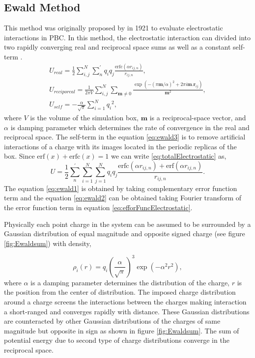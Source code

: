 \subsection{Ewald Method}
This method was originally proposed by  in 1921 to evaluate electrostatic interactions in PBC. In this method, the electrostatic interaction  can divided into two rapidly converging real and reciprocal space sums as well as a constant self-term \cite{Toukmaji96}.  
\begin{subequations}
\begin{gather}
U_{real} = \frac{1}{2} \sum_{i,j}^{N}{\sum_{n}^{'}{{q_i q_j}\frac{\mathrm{erfc}(\alpha r_{ij,n})}{r_{ij,n}}}}, \label{eq:ewald1}\\
U_{reciporcal} = \frac{1}{2\pi V}\sum_{i,j}^{N}{\sum_{\mathbf{m} \neq 0}\frac{\exp(-(\pi \mathbf{m}/\alpha)^2 + 2\pi i \mathbf{m}.\mathbf{r}_{ij})}{\mathbf{m}^2}},\label{eq:ewald2} \\
U_{self} = -\frac{\alpha}{\sqrt{\pi}} \sum_{i =1}^{N} {q_i}^2 ,\label{eq:ewald3}
\end{gather}
\end{subequations}
where $V$ is the volume of the simulation box, $\mathbf{m}$ is a reciprocal-space vector, and $\alpha$ is damping parameter which determines the rate of convergence in the real and reciprocal space. The self-term in the equation \ref{eq:ewald3} is to remove artificial interactions of a charge with its images located in the periodic replicas of the box. Since  $\mathrm{erf}(x) + \mathrm{erfc}(x) = 1$ we can write \ref{eq:totalElectrostatic} as,
\begin{equation}
U = \frac{1}{2}\sum_n^{'}{\sum_{i=1}^N { \sum_{j=1}^N {q_i q_j}}}\frac{\mathrm{erfc}(\alpha r_{ij,n})+\mathrm{erf}(\alpha r_{ij,n})}{r_{ij,n}}.
\label{eq:efforFuncElectrostatic}
\end{equation}
The equation \ref{eq:ewald1} is obtained by taking complementary error function term and the equation \ref{eq:ewald2} can be obtained taking Fourier transform of the error function term in equation \ref{eq:efforFuncElectrostatic}.
 
Physically each point charge in the system can be assumed to be surrounded by a Gaussian distribution of equal magnitude and opposite signed charge (see figure \ref{fig:Ewaldsum}) with density,

\begin{equation}
\rho_i (r) = q_i \left(\frac{\alpha}{\sqrt{\pi}}\right)^3 \exp(-\alpha^2 r^2),
\label{eq:chargeDistribution}
\end{equation}
where $\alpha$ is a damping parameter determines the distribution of the charge, $r$ is the position from the center of distribution. The imposed charge distribution around a charge screens the interactions between the charges making interaction a short-ranged and converges rapidly with distance. These Gaussian distributions are counteracted by other Gaussian distributions of the charges of same magnitude but opposite in sign as shown in figure \ref{fig:Ewaldsum}\cite{Toukmaji96}. The sum of potential energy due to second type of charge distributions converge in the reciprocal space. 

